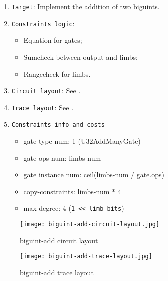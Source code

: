 
\begin{enumerate}
    \item \verb|Target|: Implement the addition of two biguints.
    \item \verb|Constraints logic|: 
        \begin{itemize}
            \item Equation for gates;
            \item Sumcheck between output and limbs;
            \item Rangecheck for limbs.
        \end{itemize}
    \item \verb|Circuit layout|: See .
    \item \verb|Trace layout|: See .
    \item \verb|Constraints info and costs|
    \begin{itemize}
        \item gate type num: 1 (U32AddManyGate)
        \item gate ops num: limbs-num
        \item gate instance num: ceil(limbs-num / gate.ops)
        \item copy-constraints: limbs-num * 4
        \item max-degree: 4 (\verb|1 << limb-bits|)
    \end{itemize}
\end{enumerate}

\begin{figure}[!ht]
    \centering
    \texttt{[image: biguint-add-circuit-layout.jpg]}
    \caption{biguint-add circuit layout}
    \label{fig:biguint-add-circuit-layout}
\end{figure}
 
\begin{figure}[!ht]
    \centering
    \texttt{[image: biguint-add-trace-layout.jpg]}
    \caption{biguint-add trace layout}
    \label{fig:biguint-add-trace-layout}
\end{figure}
